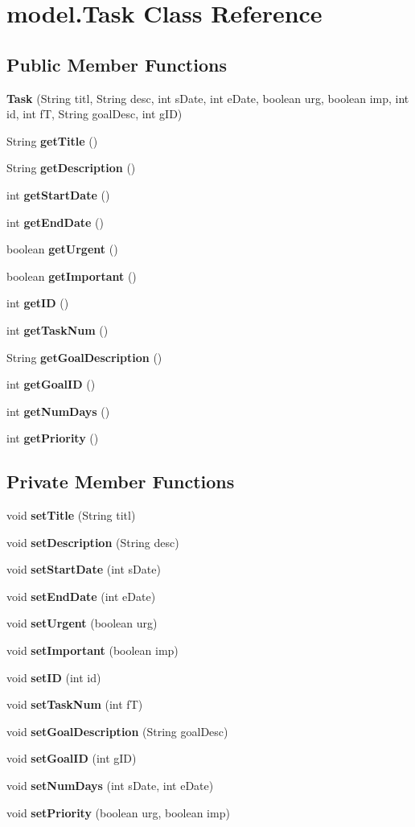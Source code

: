 \section{model.\+Task Class Reference}
\label{classmodel_1_1_task}
\subsection*{Public Member Functions}
\begin{DoxyCompactItemize}
\item 
\textbf{ Task} (String titl, String desc, int s\+Date, int e\+Date, boolean urg, boolean imp, int id, int fT, String goal\+Desc, int g\+ID)
\item 
String \textbf{ get\+Title} ()
\item 
String \textbf{ get\+Description} ()
\item 
int \textbf{ get\+Start\+Date} ()
\item 
int \textbf{ get\+End\+Date} ()
\item 
boolean \textbf{ get\+Urgent} ()
\item 
boolean \textbf{ get\+Important} ()
\item 
int \textbf{ get\+ID} ()
\item 
int \textbf{ get\+Task\+Num} ()
\item 
String \textbf{ get\+Goal\+Description} ()
\item 
int \textbf{ get\+Goal\+ID} ()
\item 
int \textbf{ get\+Num\+Days} ()
\item 
int \textbf{ get\+Priority} ()
\end{DoxyCompactItemize}
\subsection*{Private Member Functions}
\begin{DoxyCompactItemize}
\item 
void \textbf{ set\+Title} (String titl)
\item 
void \textbf{ set\+Description} (String desc)
\item 
void \textbf{ set\+Start\+Date} (int s\+Date)
\item 
void \textbf{ set\+End\+Date} (int e\+Date)
\item 
void \textbf{ set\+Urgent} (boolean urg)
\item 
void \textbf{ set\+Important} (boolean imp)
\item 
void \textbf{ set\+ID} (int id)
\item 
void \textbf{ set\+Task\+Num} (int fT)
\item 
void \textbf{ set\+Goal\+Description} (String goal\+Desc)
\item 
void \textbf{ set\+Goal\+ID} (int g\+ID)
\item 
void \textbf{ set\+Num\+Days} (int s\+Date, int e\+Date)
\item 
void \textbf{ set\+Priority} (boolean urg, boolean imp)
\end{DoxyCompactItemize}
